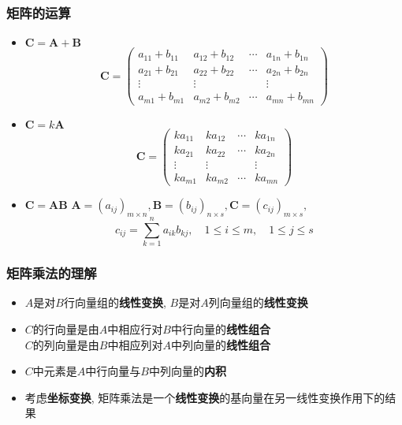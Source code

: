 \documentclass{article}
\begin{document}
			\subsubsection{矩阵的运算}
				\begin{itemize}
					\item $\boldsymbol{C}=\boldsymbol{A}+\boldsymbol{B}$
					$$
					\boldsymbol{C}=\left(\begin{array}{cccc}
						a_{11}+b_{11} & a_{12}+b_{12} & \cdots & a_{1 n}+b_{1 n} \\
						a_{21}+b_{21} & a_{22}+b_{22} & \cdots & a_{2 n}+b_{2 n} \\
						\vdots & \vdots & & \vdots \\
						a_{m 1}+b_{m 1} & a_{m 2}+b_{m 2} & \cdots & a_{m n}+b_{m n}
					\end{array}\right)
					$$
					\item $\boldsymbol{C}=k\boldsymbol{A}$
					$$
					\boldsymbol{C}=\left(\begin{array}{cccc}
						k a_{11} & k a_{12} & \cdots & k a_{1 n} \\
						k a_{21} & k a_{22} & \cdots & k a_{2 n} \\
						\vdots & \vdots & & \vdots \\
						k a_{m 1} & k a_{m 2} & \cdots & k a_{m n}
					\end{array}\right)
					$$
					\item $\boldsymbol{C}=\boldsymbol{AB}$
					$\boldsymbol{A}=\left(a_{i j}\right)_{m \times n},\boldsymbol{B}=\left(b_{i j}\right)_{n \times s},\boldsymbol{C}=\left(c_{i j}\right)_{m \times s},$
					$$
					c_{i j}=\sum_{k=1}^{n} a_{i k} b_{k j}, \quad 1 \leqslant i \leqslant m, \quad 1 \leqslant j \leqslant s
					$$
				\end{itemize}
				\subsubsection*{矩阵乘法的理解}
					\begin{itemize}
						\item $A$是对$B$行向量组的\textbf{线性变换}, $B$是对$A$列向量组的\textbf{线性变换}
						\item $C$的行向量是由$A$中相应行对$B$中行向量的\textbf{线性组合}\\$C$的列向量是由$B$中相应列对$A$中列向量的\textbf{线性组合}
						\item $C$中元素是$A$中行向量与$B$中列向量的\textbf{内积}
						\item 考虑\textbf{坐标变换}, 矩阵乘法是一个\textbf{线性变换}的基向量在另一线性变换作用下的结果
					\end{itemize}
\end{document}
